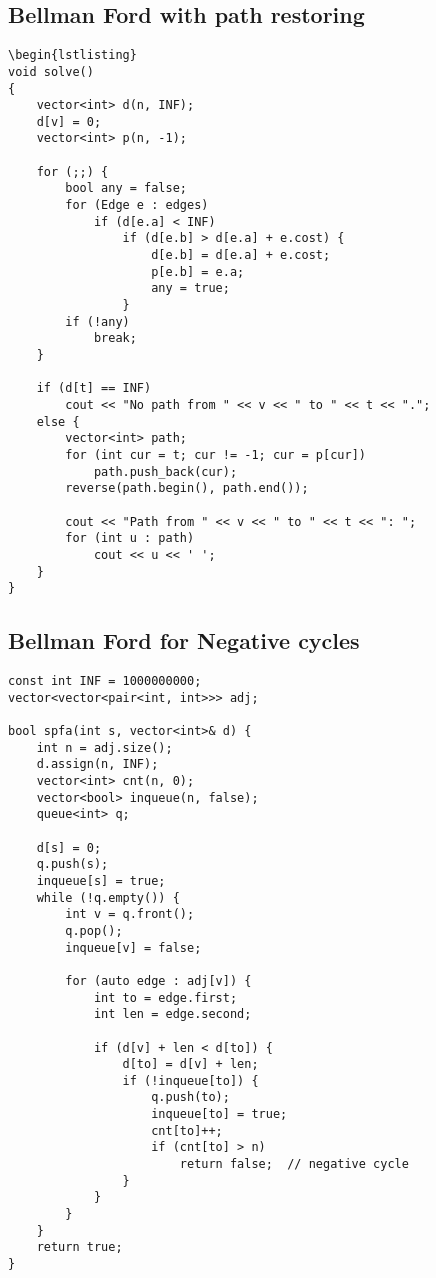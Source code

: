 \documentclass{article}
\begin{document}
\subsection{Bellman Ford with path restoring}
\begin{lstlisting}
\begin{lstlisting}
void solve()
{
    vector<int> d(n, INF);
    d[v] = 0;
    vector<int> p(n, -1);

    for (;;) {
        bool any = false;
        for (Edge e : edges)
            if (d[e.a] < INF)
                if (d[e.b] > d[e.a] + e.cost) {
                    d[e.b] = d[e.a] + e.cost;
                    p[e.b] = e.a;
                    any = true;
                }
        if (!any)
            break;
    }

    if (d[t] == INF)
        cout << "No path from " << v << " to " << t << ".";
    else {
        vector<int> path;
        for (int cur = t; cur != -1; cur = p[cur])
            path.push_back(cur);
        reverse(path.begin(), path.end());

        cout << "Path from " << v << " to " << t << ": ";
        for (int u : path)
            cout << u << ' ';
    }
}
\end{lstlisting}
\subsection{Bellman Ford for Negative cycles}
\begin{lstlisting}
const int INF = 1000000000;
vector<vector<pair<int, int>>> adj;

bool spfa(int s, vector<int>& d) {
    int n = adj.size();
    d.assign(n, INF);
    vector<int> cnt(n, 0);
    vector<bool> inqueue(n, false);
    queue<int> q;

    d[s] = 0;
    q.push(s);
    inqueue[s] = true;
    while (!q.empty()) {
        int v = q.front();
        q.pop();
        inqueue[v] = false;

        for (auto edge : adj[v]) {
            int to = edge.first;
            int len = edge.second;

            if (d[v] + len < d[to]) {
                d[to] = d[v] + len;
                if (!inqueue[to]) {
                    q.push(to);
                    inqueue[to] = true;
                    cnt[to]++;
                    if (cnt[to] > n)
                        return false;  // negative cycle
                }
            }
        }
    }
    return true;
}

\end{lstlisting}
\end{document}
